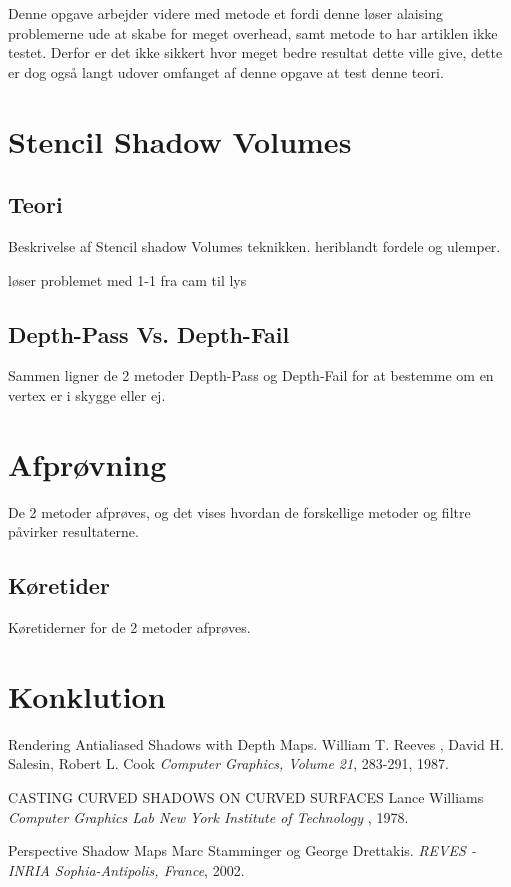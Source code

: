 \documentclass[11pt,a4paper]{article}
\begin{document}
Denne opgave arbejder videre med metode et fordi denne løser alaising problemerne ude at skabe for meget overhead, samt  metode to har artiklen \cite{PCF} ikke testet. Derfor er det ikke sikkert hvor meget bedre resultat dette ville give, dette er dog også langt udover omfanget af denne opgave at test denne teori.





\newpage 
\section{Stencil Shadow Volumes}

\subsection{Teori}
Beskrivelse af Stencil shadow Volumes teknikken. heriblandt fordele og ulemper.

løser problemet med 1-1 fra cam til lys

\subsection{Depth-Pass Vs. Depth-Fail}
Sammen ligner de 2 metoder Depth-Pass og Depth-Fail for at bestemme om en vertex er i skygge eller ej.


\section{Afprøvning}
 De 2 metoder afprøves, og det vises hvordan de forskellige metoder og filtre påvirker resultaterne.	

\subsection{Køretider}
Køretiderner for de 2 metoder afprøves.

\section{Konklution}



\newpage 

\begin{thebibliography}{100} %
 
\addtolength{\leftmargin}{0.2in} %
\setlength{\itemindent}{-0.2in} 

 Rendering Antialiased Shadows with Depth Maps.
  William T. Reeves , David H. Salesin, Robert L. Cook 
  \emph{Computer Graphics, Volume 21}, 283-291, 1987.
  
 CASTING CURVED SHADOWS ON CURVED SURFACES 
  Lance Williams
  \emph{Computer Graphics Lab New York Institute of Technology }, 1978.

 Perspective Shadow Maps 
  Marc Stamminger og George Drettakis.
  \emph{REVES - INRIA Sophia-Antipolis, France}, 2002.
    
  
  
\end{thebibliography} 
\end{document}
